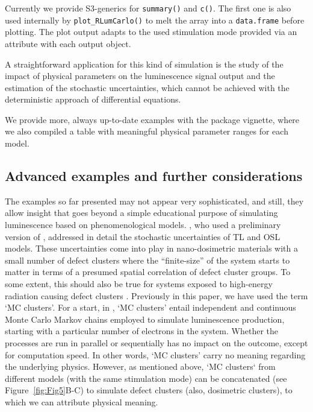 Currently we provide S3-generics for \texttt{summary()} and
\texttt{c()}. The first one is also used internally by
\texttt{plot\_RLumCarlo()} to melt the array into a \texttt{data.frame}
before plotting. The plot output adapts to the used stimulation mode
provided via an attribute with each output object.

A straightforward application for this kind of simulation is the study
of the impact of physical parameters on the luminescence signal output
and the estimation of the stochastic uncertainties, which cannot be
achieved with the deterministic approach of differential equations.

We provide more, always up-to-date examples with the package vignette,
where we also compiled a table with meaningful physical parameter ranges
for each model.

\hypertarget{advanced-examples-and-further-considerations}{%
\subsection{Advanced examples and further
considerations}\label{advanced-examples-and-further-considerations}}

The examples so far presented may not appear very sophisticated, and
still, they allow insight that goes beyond a simple educational purpose
of simulating luminescence based on phenomenological models.
\citet{Pagonis:2020bt}, who used a preliminary version of
, addressed in detail the stochastic uncertainties of
TL and OSL models. These uncertainties come into play in nano-dosimetric
materials with a small number of defect clusters where the
``finite-size'' \citep{Mandowski:1991ha} of the system starts to matter
in terms of a presumed spatial correlation of defect cluster groups. To
some extent, this should also be true for systems exposed to high-energy
radiation causing defect clusters
\citep[e.g.,][]{Mandowski:1991ha, Mandowski:1992ke}. Previously in this
paper, we have used the term `MC clusters'. For a start, in
, `MC clusters' entail independent and continuous
Monte Carlo Markov chains employed to simulate luminescence production,
starting with a particular number of electrons in the system. Whether
the processes are run in parallel or sequentially has no impact on the
outcome, except for computation speed. In other words, `MC clusters'
carry no meaning regarding the underlying physics. However, as mentioned
above, `MC clusters` from different models (with the same stimulation
mode) can be concatenated (see Figure\(~\) \ref{fig:Fig5}B-C) to
simulate defect clusters (also, dosimetric clusters), to which we can
attribute physical meaning.

